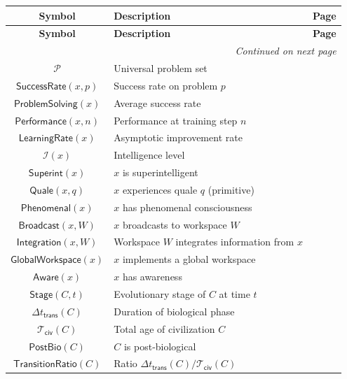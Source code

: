 \documentclass{amsart}
\newenvironment{glossarytable}{%
	\renewcommand{\arraystretch}{1.3}%
	\setlength{\tabcolsep}{4pt}%
	\begin{longtable}{|c|l|c|}
		\hline
		\textbf{Symbol} & \textbf{Description} & \textbf{Page} \\
		\hline
		\endfirsthead
		\hline
		\textbf{Symbol} & \textbf{Description} & \textbf{Page} \\
		\hline
		\endhead
		\hline
		\multicolumn{3}{r}{\textit{Continued on next page}} \\
		\endfoot
		\hline
		\endlastfoot
	}{%
	\end{longtable}%
}
\theoremstyle{break}
\newcommand{\IsSuperintelligent}[1]{\mathsf{Superint}(#1)}
\newcommand{\PostBiological}[1]{\mathsf{PostBio}(#1)}
\newcommand{\TransitionTime}[1]{\Delta t_{\mathsf{trans}}(#1)}
\newcommand{\CivilizationAge}[1]{\mathcal{T}_{\mathsf{civ}}(#1)}
\newcommand{\HasAwareness}[1]{\mathsf{Aware}(#1)}
\begin{document}
\begin{glossarytable}
	$\mathcal{P}$ & Universal problem set & \pageref{def:problemspace} \\
	$\mathsf{SuccessRate}(x,p)$ & Success rate on problem $p$ & \pageref{def:successrate} \\
	$\mathsf{ProblemSolving}(x)$ & Average success rate & \pageref{def:problemsolving} \\
	$\mathsf{Performance}(x,n)$ & Performance at training step $n$ & \pageref{def:performance} \\
	$\mathsf{LearningRate}(x)$ & Asymptotic improvement rate & \pageref{def:learningrate} \\
	$\mathcal{I}(x)$ & Intelligence level & \pageref{def:intelligence} \\
	$\IsSuperintelligent{x}$ & $x$ is superintelligent & \pageref{def:superint} \\
	
	$\mathsf{Quale}(x,q)$ & $x$ experiences quale $q$ (primitive) & \pageref{def:quale} \\
	$\mathsf{Phenomenal}(x)$ & $x$ has phenomenal consciousness & \pageref{def:phenomenal} \\
	$\mathsf{Broadcast}(x,W)$ & $x$ broadcasts to workspace $W$ & \pageref{def:broadcast} \\
	$\mathsf{Integration}(x,W)$ & Workspace $W$ integrates information from $x$ & \pageref{def:integration} \\
	$\mathsf{GlobalWorkspace}(x)$ & $x$ implements a global workspace & \pageref{def:globalworkspace} \\
	$\HasAwareness{x}$ & $x$ has awareness & \pageref{def:aware} \\
	
	$\mathsf{Stage}(C,t)$ & Evolutionary stage of $C$ at time $t$ & \pageref{def:stage} \\
	$\TransitionTime{C}$ & Duration of biological phase & \pageref{def:transitiontime} \\
	$\CivilizationAge{C}$ & Total age of civilization $C$ & \pageref{def:civilizationage} \\
	$\PostBiological{C}$ & $C$ is post‑biological & \pageref{def:postbio} \\
	$\mathsf{TransitionRatio}(C)$ & Ratio $\TransitionTime{C}/\CivilizationAge{C}$ & \pageref{def:transratio} \\
	

\end{glossarytable}
\end{document}
